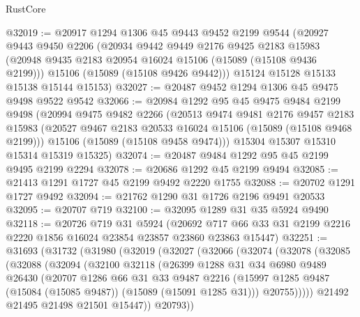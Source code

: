 \begin{lexlean}{RustCore}
\begin{coremodule}
@32019 := @20917
    @1294
    @1306
    @45
    @9443
    @9452
    @2199
    @9544
    (@20927
      @9443
      @9450
      @2206
      (@20934
        @9442
        @9449
        @2176
        @9425
        @2183
        @15983
        (@20948 @9435 @2183 @20954 @16024 @15106 (@15089 (@15108 @9436 @2199)))
        @15106
        (@15089 (@15108 @9426 @9442)))
      @15124
      @15128
      @15133
      @15138
      @15144
      @15153)
@32027 := @20487 @9452 @1294 @1306 @45 @9475 @9498 @9522 @9542
@32066 := @20984
    @1292
    @95
    @45
    @9475
    @9484
    @2199
    @9498
    (@20994
      @9475
      @9482
      @2266
      (@20513
        @9474
        @9481
        @2176
        @9457
        @2183
        @15983
        (@20527 @9467 @2183 @20533 @16024 @15106 (@15089 (@15108 @9468 @2199)))
        @15106
        (@15089 (@15108 @9458 @9474)))
      @15304
      @15307
      @15310
      @15314
      @15319
      @15325)
@32074 := @20487 @9484 @1292 @95 @45 @2199 @9495 @2199 @2294
@32078 := @20686 @1292 @45 @2199 @9494
@32085 := @21413 @1291 @1727 @45 @2199 @9492 @2220 @1755
@32088 := @20702 @1291 @1727 @9492
@32094 := @21762 @1290 @31 @1726 @2196 @9491 @20533
@32095 := @20707 @719
@32100 := @32095 @1289 @31 @35 @5924 @9490
@32118 := @20726
    @719
    @31
    @5924
    (@20692 @717 @66 @33 @31 @2199 @2216 @2220 @1856 @16024 @23854 @23857 @23860 @23863 @15447)
@32251 := @31693
    (@31732
      (@31980
        (@32019
          (@32027
            (@32066
              (@32074
                (@32078
                  (@32085
                    (@32088
                      (@32094
                        (@32100
                          @32118
                          (@26399
                            @1288
                            @31
                            @34
                            @6980
                            @9489
                            @26430
                            (@20707
                              @1286
                              @66
                              @31
                              @33
                              @9487
                              @2216
                              (@15997
                                @1285
                                @9487
                                (@15084 (@15085 @9487))
                                (@15089 (@15091 @1285 @31)))
                              @20755)))))
                    @21492
                    @21495
                    @21498
                    @21501
                    @15447))
                @20793))

\end{coremodule}
\end{lexlean}

